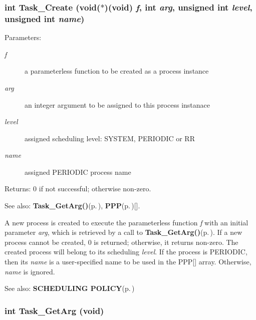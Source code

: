 \subsubsection{\setlength{\rightskip}{0pt plus 5cm}int Task\_\-Create (void($\ast$)(void) {\em f}, int {\em arg}, unsigned int {\em level}, unsigned int {\em name})}\label{os_8c_d26f7e7c3185a703e89e97547747b03e}


\begin{Desc}
\item[Parameters:]
\begin{description}
\item[{\em f}]a parameterless function to be created as a process instance \item[{\em arg}]an integer argument to be assigned to this process instanace \item[{\em level}]assigned scheduling level: SYSTEM, PERIODIC or RR \item[{\em name}]assigned PERIODIC process name \end{description}
\end{Desc}
\begin{Desc}
\item[Returns:]0 if not successful; otherwise non-zero. \end{Desc}
\begin{Desc}
\item[See also:]{\bf Task\_\-Get\-Arg()}{\rm (p.\,\pageref{os_8c_dc48a5ac983c4656508f39c0ee65283f})}, {\bf PPP}{\rm (p.\,\pageref{os_8h_9139cb65cf60e47afed151765972c100})}[].\end{Desc}
A new process is created to execute the parameterless function {\em f\/} with an initial parameter {\em arg\/}, which is retrieved by a call to {\bf Task\_\-Get\-Arg()}{\rm (p.\,\pageref{os_8c_dc48a5ac983c4656508f39c0ee65283f})}. If a new process cannot be created, 0 is returned; otherwise, it returns non-zero. The created process will belong to its scheduling {\em level\/}. If the process is PERIODIC, then its {\em name\/} is a user-specified name to be used in the PPP[] array. Otherwise, {\em name\/} is ignored. \begin{Desc}
\item[See also:]{\bf SCHEDULING POLICY}{\rm (p.\,\pageref{index_policy})} \end{Desc}
\subsubsection{\setlength{\rightskip}{0pt plus 5cm}int Task\_\-Get\-Arg (void)}\label{os_8c_dc48a5ac983c4656508f39c0ee65283f}


